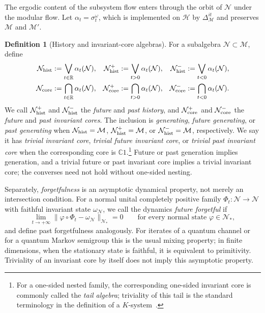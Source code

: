 \documentclass[a4paper,11pt]{article}
\theoremstyle{definition}
\newtheorem{definition}{Definition}[section]
\newcommand{\nn}{\nonumber}
\newcommand{\mN}{\mathcal{N}}
\newcommand{\mM}{\mathcal{M}}
\begin{document}
The ergodic content of the subsystem flow enters through the orbit of $\mN$ under the modular flow. Let $\alpha_t=\sigma^{\omega}_t$, which is implemented on $\mathcal H$ by $\Delta_{\mM}^{it}$ and preserves $\mM$ and $\mM'$.

\begin{definition}[History and invariant-core algebras]\label{def:history-memory}
For a subalgebra $\mN\subset\mM$, define
\begin{align}
 \mN_{\rm hist}&:=\bigvee_{t\in\mathbb R}\alpha_t(\mN), &
 \mN_{\rm hist}^{+}&:=\bigvee_{t>0}\alpha_t(\mN), &
 \mN_{\rm hist}^{-}&:=\bigvee_{t<0}\alpha_t(\mN),\nn\\
 \mN_{\rm core}&:=\bigcap_{t\in\mathbb R}\alpha_t(\mN), &
 \mN_{\rm core}^{+}&:=\bigcap_{t>0}\alpha_t(\mN), &
 \mN_{\rm core}^{-}&:=\bigcap_{t<0}\alpha_t(\mN).
\end{align}
We call $\mN_{\rm hist}^{+}$ and $\mN_{\rm hist}^{-}$ the \emph{future} and \emph{past history}, and $\mN_{\rm core}^{+}$ and $\mN_{\rm core}^{-}$ the \emph{future} and \emph{past invariant cores}. The inclusion is \emph{generating}, \emph{future generating}, or \emph{past generating} when $\mN_{\rm hist}=\mM$, $\mN_{\rm hist}^{+}=\mM$, or $\mN_{\rm hist}^{-}=\mM$, respectively. We say it has \emph{trivial invariant core}, \emph{trivial future invariant core}, or \emph{trivial past invariant core} when the corresponding core is $\mathbb C1$.\footnote{For a one-sided nested family, the corresponding one-sided invariant core is commonly called the \emph{tail algebra}; triviality of this tail is the standard terminology in the definition of a $K$-system~\cite{CornfeldFominSinai1982,ouseph2024local}.} Future or past generation implies generation, and a trivial future or past invariant core implies a trivial invariant core; the converses need not hold without one-sided nesting.

Separately, \emph{forgetfulness} is an asymptotic dynamical property, not merely an intersection condition. For a normal unital completely positive family $\Phi_t:\mN\to\mN$ with faithful invariant state $\omega_{\mN}$, we call the dynamics \emph{future forgetful} if
\begin{equation}
 \lim_{t\to+\infty}\|\varphi\circ\Phi_t-\omega_{\mN}\|_{\mN_*}=0
 \qquad\text{for every normal state }\varphi\in\mN_* ,
 \label{eq:forgetful-dynamics}
\end{equation}
and define past forgetfulness analogously. For iterates of a quantum channel or for a quantum Markov semigroup this is the usual mixing property; in finite dimensions, when the stationary state is faithful, it is equivalent to primitivity. Triviality of an invariant core by itself does not imply this asymptotic property.
\end{definition}
\end{document}

